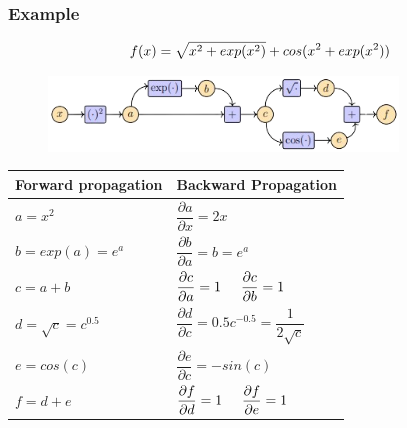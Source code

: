   

\subsubsection*{Example}

\[
    \hfill
    f(x) = \sqrt{x^2 + exp(x^2)} + cos(x^2 + exp(x^2))
    \hfill
\]
\begin{table}[H]
    \begin{minipage}{0.59\linewidth}
        \begin{figure}[H]
            \centering
            \includegraphics[width=\linewidth, height=2cm, keepaspectratio]{Pictures/maths/AutoDiff-ex5.14.png}
        \end{figure}
    \end{minipage}
    \hfill
    \begin{minipage}{0.39\linewidth}
        \begin{table}[H]
            \centering
            \renewcommand{\arraystretch}{2}
            \begin{tabular}{p{2.5cm} l}
                \textbf{Forward propagation} & \textbf{Backward Propagation} \\ \hline
                
                $a = x^2$ & $\dfrac{\partial a}{\partial x} = 2x$ \\
        
                $b = exp(a) = e^a$ & $\dfrac{\partial b}{\partial a} = b = e^a$\\
        
                $c = a+b$ & $
                \dfrac{\partial c}{\partial a}=1 
                \hspace{0.5cm} 
                \dfrac{\partial c}{\partial b}=1$ \\
        
                $d = \sqrt{c} = c^{0.5}$ & $\dfrac{\partial d}{\partial c}=0.5c^{-0.5} = \dfrac{1}{2\sqrt{c}}$ \\
        
                $e = cos(c)$ & $\dfrac{\partial e}{\partial c} = -sin(c)$\\
        
                $f = d + e$ & $
                \dfrac{\partial f}{\partial d} = 1 
                \hspace{0.5cm} 
                \dfrac{\partial f}{\partial e} = 1$
            \end{tabular}
        \end{table}
    \end{minipage}
\end{table}

